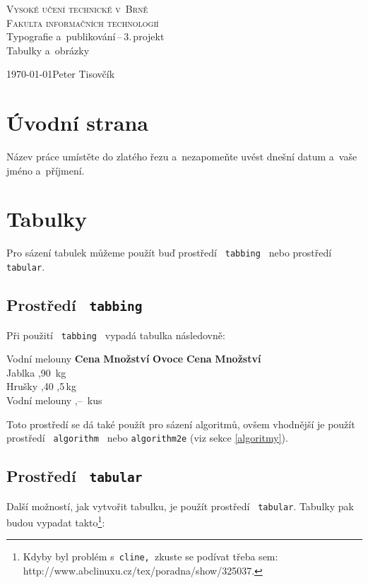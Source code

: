 \documentclass[11pt, a4paper, titlepage] {article}
\begin{document}
\begin{titlepage}
\begin{center}
	{\Huge\textsc{Vysoké učení technické v~Brně}}\\
\medskip
{\huge\textsc{Fakulta informačních technologií}}\\
{\LARGE Typografie a~publikování\,--\,3.\,projekt}\\
\medskip
{\Huge Tabulky a~obrázky}\\
\end{center}
{\LARGE \today \hfill Peter Tisovčík}
\end{titlepage}
	
\section{Úvodní strana}
Název práce umístěte do zlatého řezu a~nezapomeňte uvést dnešní datum a~vaše jméno a~příjmení.

\section{Tabulky}
Pro sázení tabulek můžeme použít buď prostředí \texttt{ tabbing } nebo prostředí \texttt{ tabular}.

\subsection{Prostředí \texttt{ tabbing}}
Při použití \verb| tabbing | vypadá tabulka následovně:

\begin{tabbing}
	Vodní melouny \quad\= \textbf{Cena} \quad\= \textbf{Množství} \kill
	\textbf{Ovoce} \> \textbf{Cena} \> \textbf{Množství}\\
	Jablka ,90 \,kg\\
	Hrušky ,40 ,5\,kg\\
	Vodní melouny ,-- \,kus
	\\
\end{tabbing}
Toto prostředí se dá také použít pro sázení algoritmů, ovšem vhodnější je použít prostředí \texttt{ algorithm } nebo \texttt{algorithm2e} (viz sekce \ref{algoritmy}).

\subsection{Prostředí \texttt{ tabular}}
Další možností, jak vytvořit tabulku, je použít prostředí \texttt{ tabular}. Tabulky pak budou vypadat takto\footnote{Kdyby byl problém s\texttt{ cline, }zkuste se podívat třeba sem:
http://www.abclinuxu.cz/tex/poradna/show/325037.}:
\end{document}

